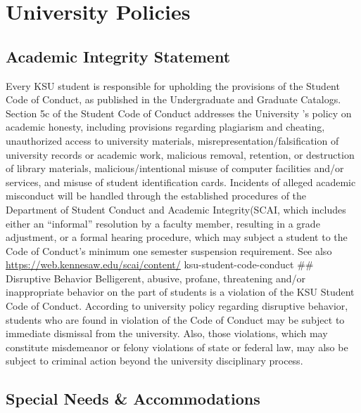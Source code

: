 \documentclass[11pt,]{article}
\begin{document}
\hypertarget{university-policies}{%
\section{University Policies}\label{university-policies}}

\hypertarget{academic-integrity-statement}{%
\subsection{Academic Integrity Statement}\label{academic-integrity-statement}}

Every KSU student is responsible for upholding the provisions of the Student Code of Conduct, as published in
the Undergraduate and Graduate Catalogs. Section 5c of the Student Code of Conduct addresses the University
's policy on academic honesty, including provisions regarding plagiarism and cheating, unauthorized access
to university materials, misrepresentation/falsification of university records or academic work, malicious
removal, retention, or destruction of library materials, malicious/intentional misuse of computer facilities and/or
services, and misuse of student identification cards. Incidents of alleged academic misconduct will be
handled through the established procedures of the Department of Student Conduct and Academic
Integrity(SCAI, which includes either an ``informal'' resolution by a faculty member, resulting in a grade
adjustment, or a formal hearing procedure, which may subject a student to the Code of Conduct's
minimum one semester suspension requirement. See also \url{https://web.kennesaw.edu/scai/content/}
ksu-student-code-conduct
\#\# Disruptive Behavior
Belligerent, abusive, profane, threatening and/or inappropriate behavior on the part of students is a violation of
the KSU Student Code of Conduct. According to university policy regarding disruptive behavior, students who
are found in violation of the Code of Conduct may be subject to immediate dismissal from the university. Also,
those violations, which may constitute misdemeanor or felony violations of state or federal law, may also be
subject to criminal action beyond the university disciplinary process.

\hypertarget{special-needs-accommodations}{%
\subsection{Special Needs \& Accommodations}\label{special-needs-accommodations}}
\end{document}
